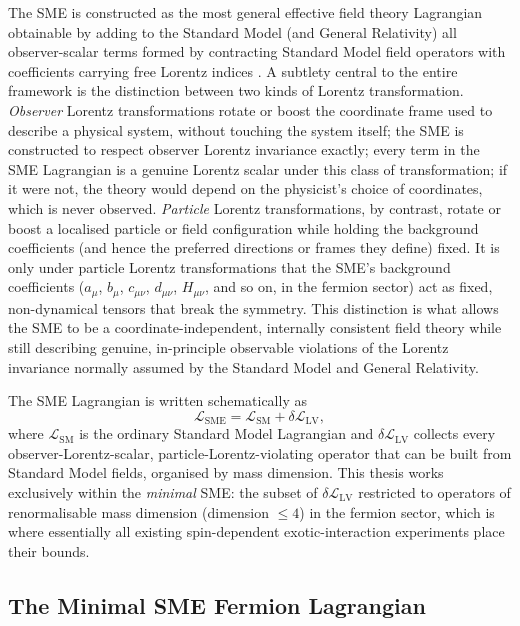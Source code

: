\documentclass[main]{subfiles}
\begin{document}
The SME is constructed as the most general effective field theory
Lagrangian obtainable by adding to the Standard Model (and General
Relativity) all observer-scalar terms formed by contracting Standard Model
field operators with coefficients carrying free Lorentz indices
\cite{Colladay1997,Colladay1998}. A subtlety central to the entire
framework is the distinction between two kinds of Lorentz transformation.
\emph{Observer} Lorentz transformations rotate or boost the coordinate frame
used to describe a physical system, without touching the system itself; the
SME is constructed to respect observer Lorentz invariance exactly; every term
in the SME Lagrangian is a genuine Lorentz scalar under this class of
transformation; if it were not, the theory would depend on the physicist's
choice of coordinates, which is never observed. \emph{Particle} Lorentz
transformations, by contrast, rotate or boost a localised particle or field
configuration while holding the background coefficients (and hence the
preferred directions or frames they define) fixed. It is only under particle
Lorentz transformations that the SME's background coefficients ($a_\mu$,
$b_\mu$, $c_{\mu\nu}$, $d_{\mu\nu}$, $H_{\mu\nu}$, and so on, in the fermion
sector) act as fixed, non-dynamical tensors that break the symmetry. This
distinction is what allows the SME to be a coordinate-independent, internally
consistent field theory while still describing genuine, in-principle
observable violations of the Lorentz invariance normally assumed by the
Standard Model and General Relativity.

The SME Lagrangian is written schematically as
\begin{equation}
  \mathcal{L}_{\mathrm{SME}} = \mathcal{L}_{\mathrm{SM}} + \delta\mathcal{L}_{\mathrm{LV}},
\end{equation}
where $\mathcal L_{\mathrm{SM}}$ is the ordinary Standard Model Lagrangian
and $\delta\mathcal L_{\mathrm{LV}}$ collects every observer-Lorentz-scalar,
particle-Lorentz-violating operator that can be built from Standard Model
fields, organised by mass dimension. This thesis works exclusively within
the \emph{minimal} SME: the subset of $\delta\mathcal L_{\mathrm{LV}}$
restricted to operators of renormalisable mass dimension (dimension $\leq4$)
in the fermion sector, which is where essentially all existing
spin-dependent exotic-interaction experiments place their bounds.

\subsection{The Minimal SME Fermion Lagrangian}
\end{document}
